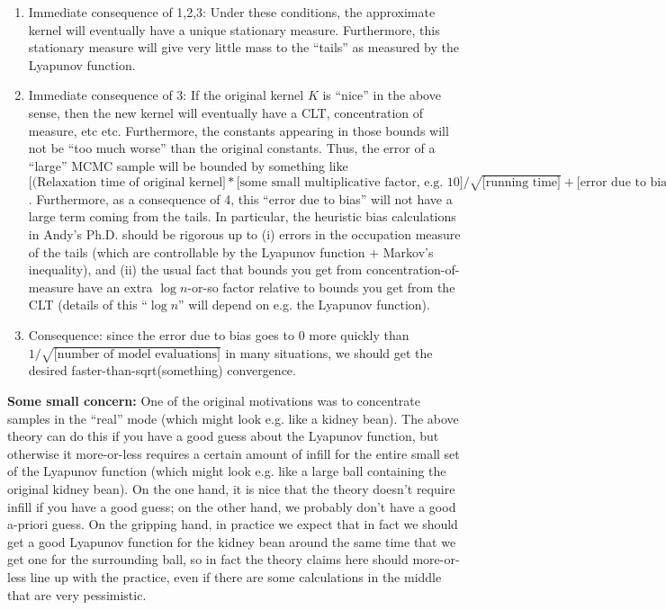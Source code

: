 \begin{enumerate}
    \item Immediate consequence of 1,2,3: Under these conditions, the approximate kernel will eventually have a unique stationary measure. Furthermore, this stationary measure will give very little mass to the ``tails'' as measured by the Lyapunov function.
    \item Immediate consequence of 3: If the original kernel $K$ is ``nice'' in the above sense, then the new kernel will eventually have a CLT, concentration of measure, etc etc. Furthermore, the constants appearing in those bounds will not be ``too much worse'' than the original constants. Thus, the error of a ``large'' MCMC sample will be bounded by something like $\mbox{[(Relaxation time of original kernel]}*\mbox{[some small multiplicative factor, e.g. 10]}/\sqrt{\mbox{[running time]}} + \mbox{[error due to bias]}$. Furthermore, as a consequence of 4, this ``error due to bias'' will not have a large term coming from the tails. In particular, the heuristic bias calculations in Andy's Ph.D. should be rigorous up to (i) errors in the occupation measure of the tails (which are controllable by the Lyapunov function + Markov's inequality), and (ii) the usual fact that bounds you get from concentration-of-measure have an extra $\log{n}$-or-so factor relative to bounds you get from the CLT (details of this ``$\log{n}$'' will depend on e.g. the Lyapunov function).
    \item Consequence: since the error due to bias goes to $0$ more quickly than $1/\sqrt{\mbox{[number of model evaluations]}}$ in many situations, we should get the desired faster-than-sqrt(something) convergence.
\end{enumerate}

\textbf{Some small concern:} One of the original motivations was to concentrate samples in the ``real'' mode (which might look e.g. like a kidney bean). The above theory can do this if you have a good guess about the Lyapunov function, but otherwise it more-or-less requires a certain amount of infill for the entire small set of the Lyapunov function (which might look e.g. like a large ball containing the original kidney bean). On the one hand, it is nice that the theory doesn't require infill if you have a good guess; on the other hand, we probably don't have a good a-priori guess. On the gripping hand, in practice we expect that in fact we should get a good Lyapunov function for the kidney bean around the same time that we get one for the surrounding ball, so in fact the theory claims here should more-or-less line up with the practice, even if there are some calculations in the middle that are very pessimistic.

